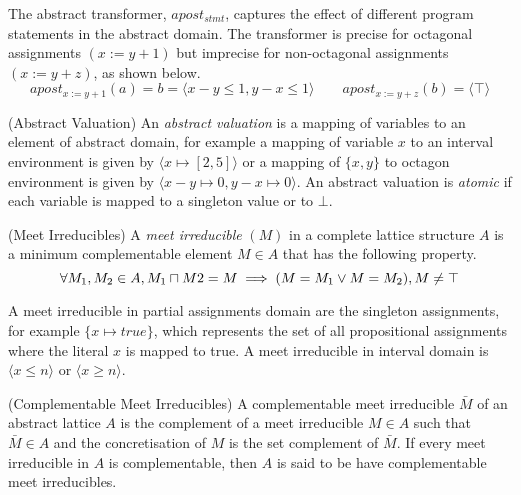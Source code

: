  
The abstract transformer, $apost_{stmt}$, captures the effect of different program 
statements in the abstract domain. The transformer is precise for octagonal 
assignments $(x:=y+1)$ but imprecise for non-octagonal assignments $(x:=y+z)$, 
as shown below.
\[apost_{x:=y+1}(a) = b = \langle x-y \leq 1, y-x \leq 1 \rangle \qquad apost_{x:=y+z}(b) = \langle \top \rangle \]  

\begin{definition}{(Abstract Valuation)} An {\em abstract valuation} is a
mapping of variables to an element of abstract domain, for example 
a mapping of variable $x$ to an interval environment is given by 
$\langle x \mapsto [2,5] \rangle$ or a mapping of $\{x,y\}$ to octagon 
environment is given by $\langle x-y \mapsto 0, y-x \mapsto 0 \rangle$.  
An abstract valuation is {\em atomic} if each variable is mapped to a singleton 
value or to $\bot$.  
\end{definition}

\begin{definition}{(Meet Irreducibles)} A {\em meet irreducible} $(M)$ 
in a complete lattice structure $A$ is a minimum complementable element 
$M \in A$ that has the following property.
\[\forall M_1, M_2 \in A, M_1 \sqcap M2 = M \implies (M = M_1 \lor M = M_2), M \neq \top \]  
\end{definition}

A meet irreducible in partial assignments domain are the singleton 
assignments, for example $\{x \mapsto true \}$, which represents the set 
of all propositional assignments where the literal $x$ is mapped to true.  
A meet irreducible in interval domain is $\langle x \leq n \rangle$ or 
$\langle x \geq n \rangle$.  

%
\begin{definition}{(Complementable Meet Irreducibles)} A complementable meet
irreducible $\bar{M}$ of an abstract lattice $A$ is the complement of a meet 
irreducible $M \in A$ such that $\bar{M} \in A$ and the concretisation of $M$ 
is the set complement of $\bar{M}$.  If every meet irreducible in $A$ is
complementable, then $A$ is said to be have complementable meet irreducibles.  
\end{definition}


